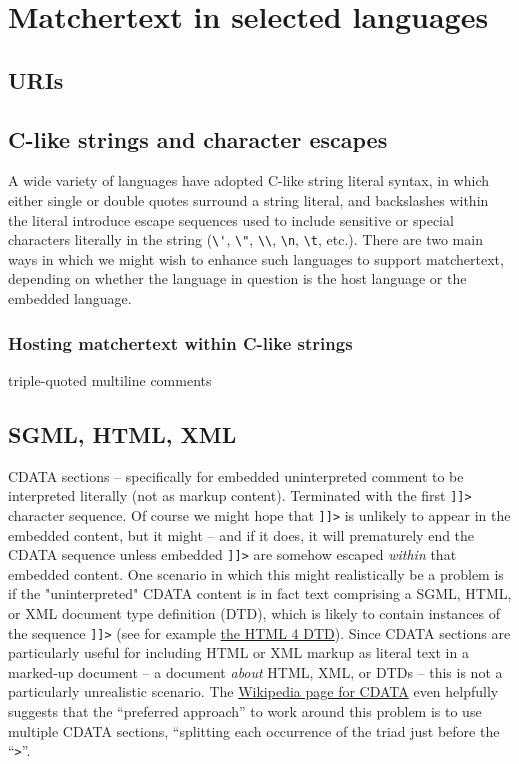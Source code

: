 \section{Matchertext in selected languages}
\label{sec:langs}

\subsection{URIs}

\subsection{C-like strings and character escapes}

A wide variety of languages have adopted C-like string literal syntax,
in which either single or double quotes surround a string literal,
and backslashes within the literal introduce escape sequences
used to include sensitive or special characters literally in the string
(\eg \verb|\'|, \verb|\"|, \verb|\\|, \verb|\n|, \verb|\t|, etc.).
There are two main ways in which we might wish to enhance such languages
to support matchertext,
depending on whether the language in question is the host language
or the embedded language.

\subsubsection{Hosting matchertext within C-like strings}


triple-quoted multiline comments

\subsection{SGML, HTML, XML}

CDATA sections -- specifically for embedded uninterpreted comment
to be interpreted literally (not as markup content).
Terminated with the first \verb|]]>| character sequence.
Of course we might hope that \verb|]]>| is unlikely to appear
in the embedded content, but it might --
and if it does, it will prematurely end the CDATA sequence
unless embedded \verb|]]>| are somehow escaped
\emph{within} that embedded content.
One scenario in which this might realistically be a problem
is if the "uninterpreted" CDATA content is in fact
text comprising a SGML, HTML, or XML document type definition (DTD),
which is likely to contain instances of the sequence \verb|]]>|
(see for example
\href{https://www.w3.org/TR/html4/sgml/dtd.html}{the HTML 4 DTD}).
Since CDATA sections are particularly useful
for including HTML or XML markup as literal text in a marked-up document --
\eg a document \emph{about} HTML, XML, or DTDs --
this is not a particularly unrealistic scenario.
The \href{https://en.wikipedia.org/wiki/CDATA}{Wikipedia page for CDATA}
even helpfully suggests that the ``preferred approach''
to work around this problem is to use multiple CDATA sections,
``splitting each occurrence of the triad
just before the ``\verb|>|''.

